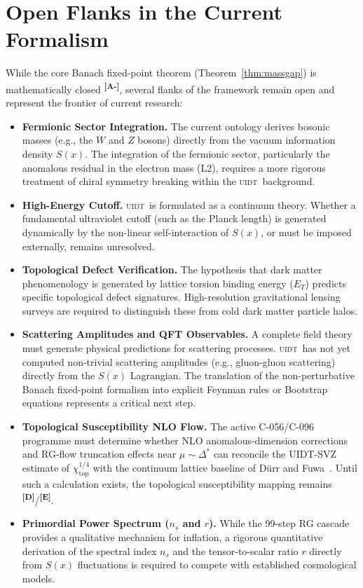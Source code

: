 \documentclass[12pt,a4paper,twoside]{article}
\theoremstyle{plain}
\theoremstyle{definition}
\theoremstyle{remark}
\newcommand{\UIDT}{\textsc{uidt}}
\newcommand{\catmark}[1]{\textsuperscript{\textsf{\textbf{[#1]}}}}
\newcommand{\Sx}{S(x)}
\begin{document}
\newpage

\section{Open Flanks in the Current Formalism}
\label{sec:openflanks}

While the core Banach fixed-point theorem (Theorem~\ref{thm:massgap}) is
mathematically closed \catmark{A-}, several flanks of the framework remain
open and represent the frontier of current research:

\begin{itemize}
  \item \textbf{Fermionic Sector Integration.} The current ontology derives
    bosonic masses (e.g., the $W$ and $Z$ bosons) directly from the vacuum
    information density $\Sx$. The integration of the fermionic sector,
    particularly the anomalous residual in the electron mass (L2), requires a
    more rigorous treatment of chiral symmetry breaking within the \UIDT\
    background.
  \item \textbf{High-Energy Cutoff.} \UIDT\ is formulated as a continuum theory.
    Whether a fundamental ultraviolet cutoff (such as the Planck length) is
    generated dynamically by the non-linear self-interaction of $\Sx$, or
    must be imposed externally, remains unresolved.
  \item \textbf{Topological Defect Verification.} The hypothesis that dark
    matter phenomenology is generated by lattice torsion binding energy ($E_T$)
    predicts specific topological defect signatures. High-resolution
    gravitational lensing surveys are required to distinguish these from
    cold dark matter particle halos.
  \item \textbf{Scattering Amplitudes and QFT Observables.} A complete field theory
    must generate physical predictions for scattering processes. \UIDT\ has not
    yet computed non-trivial scattering amplitudes (e.g., gluon-gluon scattering)
    directly from the $S(x)$ Lagrangian. The translation of the non-perturbative
    Banach fixed-point formalism into explicit Feynman rules or Bootstrap
    equations represents a critical next step.
  \item \textbf{Topological Susceptibility NLO Flow.} The active C-056/C-096
    programme must determine whether NLO anomalous-dimension corrections and
    RG-flow truncation effects near $\mu\sim\Delta^*$ can reconcile the
    UIDT-SVZ estimate of $\chi_{\mathrm{top}}^{1/4}$ with the continuum
    lattice baseline of D\"urr and Fuwa~\cite{DurrFuwa2025}. Until such a
    calculation exists, the topological susceptibility mapping remains
    \catmark{D}/\catmark{E}.
  \item \textbf{Primordial Power Spectrum ($n_s$ and $r$).} While the
    99-step RG cascade provides a qualitative mechanism for inflation, a rigorous
    quantitative derivation of the spectral index $n_s$ and the tensor-to-scalar
    ratio $r$ directly from $S(x)$ fluctuations is required to compete with
    established cosmological models.
\end{itemize}
\end{document}
